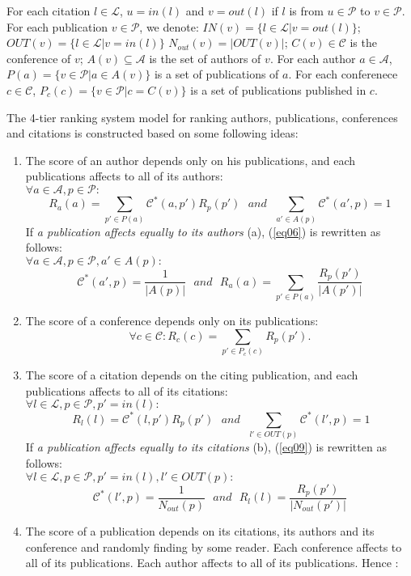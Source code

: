 \documentclass[lnicst]{svmultln}
\begin{document}
For each citation $l\in \mathcal{L}$, $u = in(l)$ and $v = out(l)$ if $l$ is from $u\in \mathcal{P}$ to $v \in \mathcal{P}$.
For each publication $v \in \mathcal{P}$, we denote: $IN(v)=\{l \in \mathcal{L}|  v=out(l)\}$; $OUT(v)=\{l \in \mathcal{L}|  v=in(l)\}$ $N_{out}(v)=|OUT(v)|$; $C(v)\in \mathcal{C}$ is the conference of $v$;  $A(v)\subseteq \mathcal{A}$ is the set of authors of $v$. For each author $a\in \mathcal{A}$, $P(a)=\{v \in \mathcal{P}|  a\in A(v)\}$ is a set of publications of $a$.  For each conferenece $c\in \mathcal{C}$,
$P_c(c)=\{v \in \mathcal{P}|  c= C(v)\}$ is a set of publications published in $c$.

The 4-tier ranking system model for ranking authors, publications, conferences and citations is constructed based on some following ideas:
\begin{enumerate}
\item The score of an author depends only on his publications, and each publications affects to all of its authors: \\
$\forall a\in\mathcal{A},p\in\mathcal{P}:$
\begin{equation}\label{eq06}
R_a(a) = \sum_{p'\in P(a)} \mathcal{C}^*(a,p')R_p(p') ~~~and~~~\sum_{a'\in A(p)}\mathcal{C}^*(a',p)=1
\end{equation}
If \textit{a publication affects equally to its authors} (a), (\ref{eq06}) is rewritten as follows:\\
$\forall a\in\mathcal{A},p\in\mathcal{P}, a'\in A(p):$
\begin{equation}\label{eq07}
\mathcal{C}^*(a',p)= \frac{1}{|A(p)|}  ~~~and~~~ R_a(a) = \sum_{p'\in P(a)} \frac{R_p(p')}{|A(p')|}
\end{equation}
\item The score of a conference depends only on its publications:
\begin{equation}\label{eq08}
\forall c\in\mathcal{C}: R_c(c) = \sum_{p'\in P_c(c)} R_p(p').
\end{equation}

\item The score of a citation depends on the citing publication, and each publications affects to all of its citations: \\
$ \forall l\in\mathcal{L}, p \in \mathcal{P}, p'=in(l):$
\begin{equation}\label{eq09}
 ~R_l(l) =  \mathcal{C}^*(l,p')R_p(p') ~~~and ~~~ \sum_{l'\in OUT(p)}\mathcal{C}^*(l',p)=1
\end{equation}
If \textit{a publication affects equally to its citations} (b), (\ref{eq09}) is rewritten as follows:\\
$\forall l\in\mathcal{L}, p \in \mathcal{P}, p'=in(l), l'\in OUT(p):$
\begin{equation}\label{eq10}
 \mathcal{C}^*(l',p)= \frac{1}{N_{out}(p)} ~~~and~~~ R_l(l) =  \frac{R_p(p')}{|N_{out}(p')|}
\end{equation}
\item  The score of a publication depends on its citations, its authors and its conference and randomly finding by some reader. Each conference affects to all of its publications. Each author affects to all of its publications. Hence :


\end{enumerate}
\end{document}
